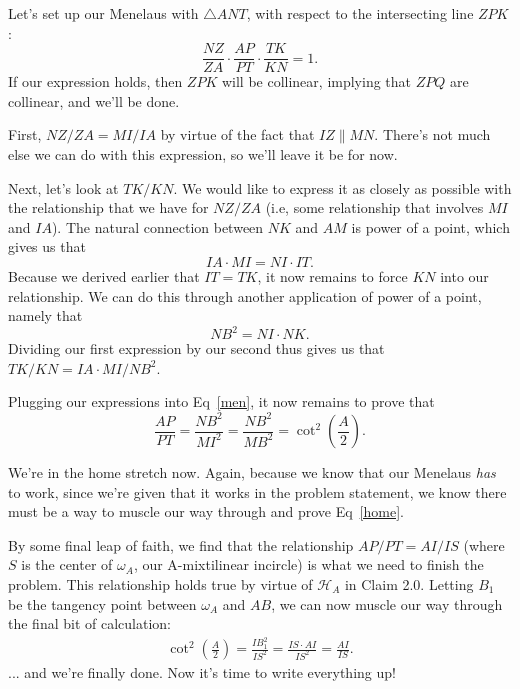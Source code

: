 Let's set up our Menelaus with $\triangle{ANT}$, with respect to the intersecting line $ZPK$:
\begin{equation}\label{men}
\frac{NZ}{ZA}\cdot \frac{AP}{PT}\cdot \frac{TK}{KN} = 1.\tag{1}
\end{equation}
If our expression holds, then $ZPK$ will be collinear, implying that $ZPQ$ are collinear, and we'll be done.\V

First, $NZ/ZA = MI/IA$ by virtue of the fact that $IZ\parallel MN$. There's not much else we can do with this expression, so we'll leave it be for now.\V

Next, let's look at $TK/KN$. We would like to express it as closely as possible with the relationship that we have for $NZ/ZA$ (i.e, some relationship that involves $MI$ and $IA$). The natural connection between $NK$ and $AM$ is power of a point, which gives us that 
\[IA\cdot MI = NI\cdot IT.\]
Because we derived earlier that $IT=TK$, it now remains to force $KN$ into our relationship. We can do this through another application of power of a point, namely that
\[NB^2 = NI\cdot NK.\]
Dividing our first expression by our second thus gives us that $TK/KN = IA\cdot MI/NB^2$.\V

Plugging our expressions into Eq~\ref{men}, it now remains to prove that
\begin{equation}\label{home}
\frac{AP}{PT} = \frac{NB^2}{MI^2} = \frac{NB^2}{MB^2} = \cot^2{\left(\frac{A}{2}\right)}.\tag{2}
\end{equation}

We're in the home stretch now. Again, because we know that our Menelaus \textit{has} to work, since we're given that it works in the problem statement, we know there must be a way to muscle our way through and prove Eq~\ref{home}.\V

By some final leap of faith, we find that the relationship $AP/PT = AI/IS$ (where $S$ is the center of $\omega_A$, our A-mixtilinear incircle) is what we need to finish the problem. This relationship holds true by virtue of $\mathcal{H}_A$ in Claim 2.0. Letting $B_1$ be the tangency point between $\omega_A$ and $AB$, we can now muscle our way through the final bit of calculation: 
\begin{align*}
    \cot^2{\left(\frac{A}{2}\right)} = \frac{IB_1^2}{IS^2} = \frac{IS\cdot AI}{IS^2} =\frac{AI}{IS}.
\end{align*}
... and we're finally done. Now it's time to write everything up!
\newpage
